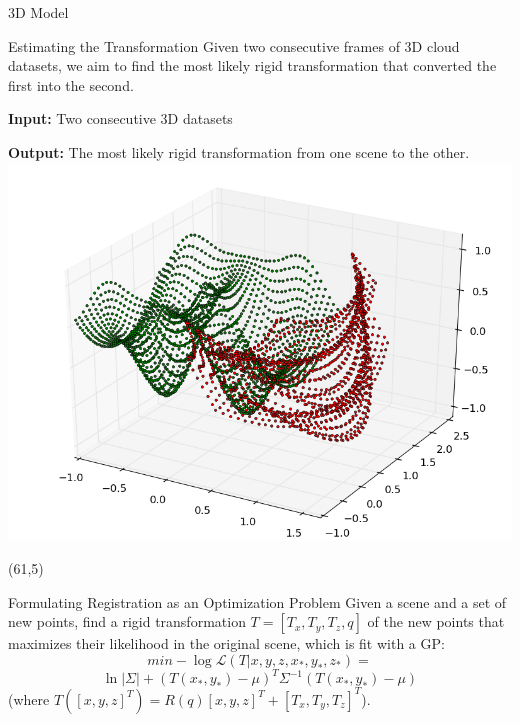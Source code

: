 \documentclass[final]{beamer}
\begin{document}
\begin{frame}{}
\begin{textblock}{27.5}
\begin{block}{3D Model}
\end{block}

\begin{block}{Estimating the Transformation}
Given two consecutive frames of 3D cloud datasets, we aim to find the most likely rigid transformation that converted the first into the second.

\textbf{Input:} Two consecutive 3D datasets

\textbf{Output:} The most likely rigid transformation from one scene to the other.
\includegraphics[width=10in]{3DWorldModel.png}
\end{block}

\end{textblock}

\begin{textblock}{27}(61,5)




\begin{block}{Formulating Registration as an Optimization Problem}
Given a scene and a set of new points, find a rigid transformation $T = [T_x,T_y,T_z,q]$ of the new points 
that maximizes their likelihood in the original scene, which is fit with a GP:
$$min -\log\mathcal{L}(T|x,y,z,x_*,y_*,z_*) =$$
$$ \ln|\Sigma| + (T(x_*,y_*) - \mu)^T \Sigma^{-1} (T(x_*,y_*) - \mu)$$
(where $T([x,y,z]^T) = R(q)[x,y,z]^T + [T_x,T_y,T_z]^T$).

\end{block}



\end{textblock}
\end{frame}
\end{document}

